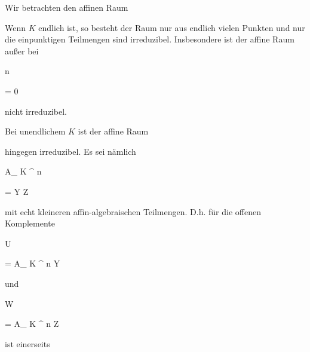 {


Wir betrachten den affinen Raum


 Wenn $K$ endlich ist, so besteht der Raum nur aus endlich vielen Punkten und nur die einpunktigen Teilmengen sind irreduzibel. Insbesondere ist der affine Raum außer bei


\mavergleichskette


{\vergleichskette


{ n
}


{ = }{ 0
}


{  }{
}


{    }{
}


{   }{
}


}
{}{}{}
nicht irreduzibel.


Bei unendlichem $K$ ist der affine Raum


 hingegen irreduzibel. Es sei nämlich


\mavergleichskette


{\vergleichskette


{ { {\mathbb A}_{  K }^{  n   } }
}


{ = }{ Y \cup Z
}


{  }{
}


{    }{
}


{   }{
}


}
{}{}{}
mit echt kleineren affin-algebraischen Teilmengen. D.h. für die offenen Komplemente


\mavergleichskette


{\vergleichskette


{ U
}


{ = }{ { {\mathbb A}_{  K }^{  n   } }  \setminus Y
}


{  }{
}


{    }{
}


{   }{
}


}
{}{}{}
und


\mavergleichskette


{\vergleichskette


{ W
}


{ = }{ { {\mathbb A}_{  K }^{  n   } } \setminus Z
}


{  }{
}


{    }{
}


{   }{
}


}
{}{}{}
ist einerseits


\mavergleichskette


{\vergleichskette


}}
